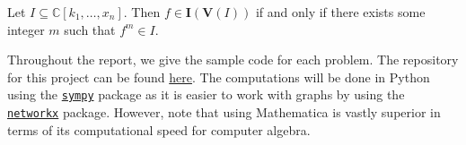 \documentclass[../main.tex]{subfiles}
\begin{document}
   \begin{theorem}
      Let $I\subseteq \mathbb{C}[k_1,\dots,x_n]$. Then $f\in\mathbf{I}(\mathbf{V}(I))$ if and only if there exists some integer $m$ such that $f^m\in I$.
  \end{theorem}


   Throughout the report, we give the sample code for each problem. The repository for this project can be found \href{https://github.com/yangdabei/graph-colouring-and-sudoku}{here}. The computations will be done in Python using the \href{https://www.sympy.org/en/index.html}{\texttt{sympy}} package as it is easier to work with graphs by using the \href{https://networkx.org/}{\texttt{networkx}} package. However, note that using Mathematica is vastly superior in terms of its computational speed for computer algebra.
\end{document}
